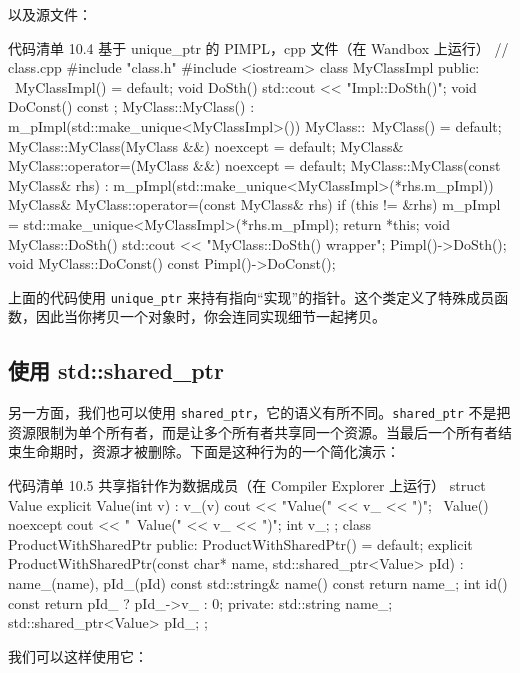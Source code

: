 以及源文件：

\begin{codeboxt}[cpp]{代码清单 10.4 基于 unique\_ptr 的 PIMPL，cpp 文件（在 Wandbox 上运行）}
// class.cpp
#include "class.h"
#include <iostream>
class MyClassImpl {
public:
~MyClassImpl() = default;
void DoSth() { std::cout << "Impl::DoSth()\n"; }
void DoConst() const { }
};
MyClass::MyClass() : m_pImpl(std::make_unique<MyClassImpl>()) { }
MyClass::~MyClass() = default;
MyClass::MyClass(MyClass &&) noexcept = default;
MyClass& MyClass::operator=(MyClass &&) noexcept = default;
MyClass::MyClass(const MyClass& rhs)
: m_pImpl(std::make_unique<MyClassImpl>(*rhs.m_pImpl)) { }
MyClass& MyClass::operator=(const MyClass& rhs) {
if (this != &rhs)
m_pImpl = std::make_unique<MyClassImpl>(*rhs.m_pImpl);
return *this;
}
void MyClass::DoSth() {
std::cout << "MyClass::DoSth() wrapper\n";
Pimpl()->DoSth();
}
void MyClass::DoConst() const {
Pimpl()->DoConst();
}
\end{codeboxt}

上面的代码使用 \texttt{unique\_ptr} 来持有指向“实现”的指针。这个类定义了特殊成员函数，因此当你拷贝一个对象时，你会连同实现细节一起拷贝。

\subsection{使用 std::shared\_ptr}

另一方面，我们也可以使用 \texttt{shared\_ptr}，它的语义有所不同。\texttt{shared\_ptr} 不是把资源限制为单个所有者，而是让多个所有者共享同一个资源。当最后一个所有者结束生命期时，资源才被删除。下面是这种行为的一个简化演示：

\begin{codeboxt}[cpp]{代码清单 10.5 共享指针作为数据成员（在 Compiler Explorer 上运行）}
struct Value {
explicit Value(int v) : v_(v) { cout << "Value(" << v_ << ")\n"; }
~Value() noexcept { cout << "~Value(" << v_ << ")\n"; }
int v_;
};
class ProductWithSharedPtr {
public:
ProductWithSharedPtr() = default;
explicit ProductWithSharedPtr(const char* name,
std::shared_ptr<Value> pId)
: name_(name), pId_(pId) { }
const std::string& name() const { return name_; }
int id() const { return pId_ ? pId_->v_ : 0; }
private:
std::string name_;
std::shared_ptr<Value> pId_;
};
\end{codeboxt}

我们可以这样使用它：

